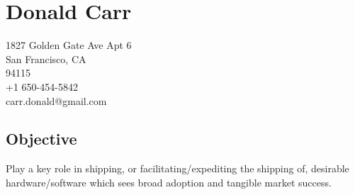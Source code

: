 \documentclass{article}
\begin{document}

\centering
\section*{Donald Carr}
1827 Golden Gate Ave Apt 6\\
San Francisco, CA \\
94115 \\
+1 650-454-5842 \\
carr.donald@gmail.com

\subsection*{Objective}

Play a key role in shipping, or facilitating/expediting the shipping of, desirable hardware/software which sees broad adoption and tangible market success.
\end{document}
